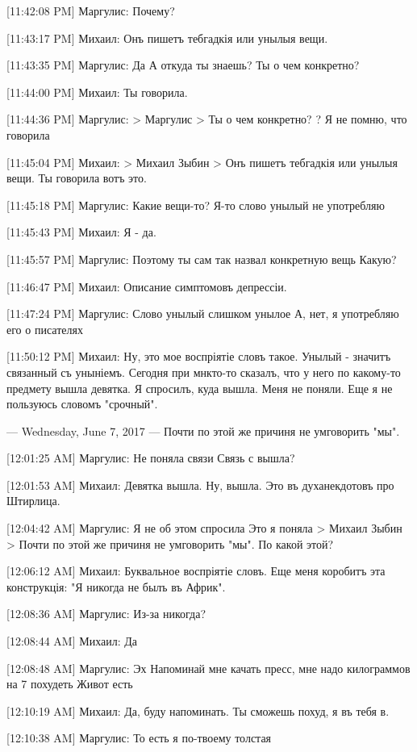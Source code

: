 \documentclass{article}
\newcommand{\yat}{{\fontencoding{X2}\selectfont\cyryat}} %
\begin{document}
[11:42:08 PM] Маргулис:
Почему?

[11:43:17 PM] Михаил:
Онъ пишетъ теб\yat гадкія или унылыя вещи.

[11:43:35 PM] Маргулис:
Да
 А откуда ты знаешь?
 Ты о чем конкретно?

[11:44:00 PM] Михаил:
Ты говорила.

[11:44:36 PM] Маргулис:
> Маргулис
> Ты о чем конкретно?
?
 Я не помню, что говорила

[11:45:04 PM] Михаил:
> Михаил Зыбин
> Онъ пишетъ теб\yat гадкія или унылыя вещи.
Ты говорила вотъ это.

[11:45:18 PM] Маргулис:
Какие вещи-то?
 Я-то слово унылый не употребляю

[11:45:43 PM] Михаил:
Я - да.

[11:45:57 PM] Маргулис:
Поэтому ты сам так назвал конкретную вещь
 Какую?

[11:46:47 PM] Михаил:
Описание симптомовъ депрессіи.

[11:47:24 PM] Маргулис:
Слово унылый слишком унылое
 А, нет, я употребляю его о писателях

[11:50:12 PM] Михаил:
Ну, это мое воспріятіе словъ такое. Унылый - значитъ связанный съ уныніемъ.
 Сегодня при мн\yat кто-то сказалъ, что у него по какому-то предмету вышла девятка. Я спросилъ, куда вышла. Меня не поняли.
 Еще я не пользуюсь словомъ "срочный".

--- Wednesday, June 7, 2017 ---
 Почти по этой же причин\yat я не ум говорить "мы".

[12:01:25 AM] Маргулис:
Не поняла связи
 Связь с вышла?

[12:01:53 AM] Михаил:
Девятка вышла.
 Ну, вышла. Это въ дух\yat анекдотовъ про Штирлица.

[12:04:42 AM] Маргулис:
Я не об этом спросила
 Это я поняла
> Михаил Зыбин
> Почти по этой же причин\yat я не ум говорить "мы".
По какой этой?

[12:06:12 AM] Михаил:
Буквальное воспріятіе словъ.
 Еще меня коробитъ эта конструкція: "Я никогда не былъ въ Африк\yat".

[12:08:36 AM] Маргулис:
Из-за никогда?

[12:08:44 AM] Михаил:
Да

[12:08:48 AM] Маргулис:
Эх
 Напоминай мне качать пресс, мне надо килограммов на 7 похудеть
 Живот есть

[12:10:19 AM] Михаил:
Да, буду напоминать. Ты сможешь похуд, я въ тебя в.

[12:10:38 AM] Маргулис:
То есть я по-твоему толстая
\end{document}
